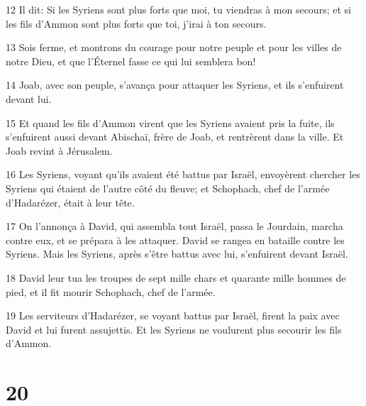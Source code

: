 \par 12 Il dit: Si les Syriens sont plus forts que moi, tu viendras à mon secours; et si les fils d'Ammon sont plus forts que toi, j'irai à ton secours.
\par 13 Sois ferme, et montrons du courage pour notre peuple et pour les villes de notre Dieu, et que l'Éternel fasse ce qui lui semblera bon!
\par 14 Joab, avec son peuple, s'avança pour attaquer les Syriens, et ils s'enfuirent devant lui.
\par 15 Et quand les fils d'Ammon virent que les Syriens avaient pris la fuite, ils s'enfuirent aussi devant Abischaï, frère de Joab, et rentrèrent dans la ville. Et Joab revint à Jérusalem.
\par 16 Les Syriens, voyant qu'ils avaient été battus par Israël, envoyèrent chercher les Syriens qui étaient de l'autre côté du fleuve; et Schophach, chef de l'armée d'Hadarézer, était à leur tête.
\par 17 On l'annonça à David, qui assembla tout Israël, passa le Jourdain, marcha contre eux, et se prépara à les attaquer. David se rangea en bataille contre les Syriens. Mais les Syriens, après s'être battus avec lui, s'enfuirent devant Israël.
\par 18 David leur tua les troupes de sept mille chars et quarante mille hommes de pied, et il fit mourir Schophach, chef de l'armée.
\par 19 Les serviteurs d'Hadarézer, se voyant battus par Israël, firent la paix avec David et lui furent assujettis. Et les Syriens ne voulurent plus secourir les fils d'Ammon.

\chapter{20}

